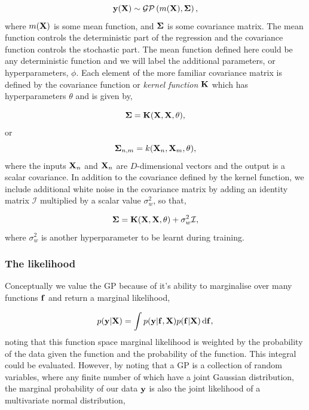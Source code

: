 \begin{equation}
{\bf y}({\bf X}) \sim \mathcal{GP}\left( m({\bf X}),  {\bf \Sigma}\right),
\end{equation}
where $m({\bf X})$ is some mean function, and $\bf \Sigma$ is some covariance matrix.  The mean function controls the deterministic part of the regression and the covariance function controls the stochastic part.  The mean function defined here could be any deterministic function and we will label the additional parameters, or hyperparameters, $\phi$.  Each element of the more familiar covariance matrix is defined by the covariance function or {\it kernel function} $\bf K$ which has hyperparameters $\theta$ and is given by,

\begin{equation}
{\bf \Sigma} = {\bf K}({\bf X}, {\bf X},  \theta),
\end{equation}
or 
\begin{equation}
{\bf \Sigma}_{n, m} = k({\bf X}_{n}, {\bf X}_{m},  \theta),
\end{equation}
where the inputs ${\bf X}_{n}$ and ${\bf X}_{n}$ are $D$-dimensional vectors and the output is a scalar covariance.
In addition to the covariance defined by the kernel function, we include additional white noise in the covariance matrix by adding an identity matrix $\mathcal{I}$ multiplied by a scalar value $\sigma_{w}^2$, so that, 

\begin{equation}
{\bf \Sigma} = {\bf K}({\bf X}, {\bf X},  \theta) + \sigma_{w}^{2} \mathcal{I},
\end{equation}
where $\sigma_{w}^2$ is another hyperparameter to be learnt during training. 

\subsubsection{The likelihood}
Conceptually we value the GP because of it's ability to marginalise over many functions $\bf f$ and return a marginal likelihood,

\begin{equation}
p({\bf y} | {\bf X}) = \int p({\bf y} | {\bf f}, {\bf X}) p({\bf f} | {\bf X}) \, {\rm d}{\bf f},
\end{equation}
noting that this function space marginal likelihood is weighted by the probability of the data given the function and the probability of the function.  This integral could be evaluated.  However, by noting that a GP is a collection of random variables, where any finite number of which have a joint Gaussian distribution, the marginal probability of our data $\bf y$ is also the joint likelihood of a multivariate normal distribution,

